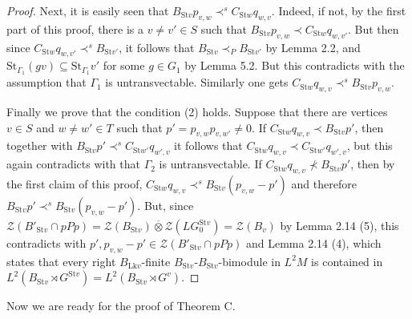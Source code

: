 \documentclass{amsart}
\theoremstyle{definition}
\renewcommand{\subset}{\subseteq}
\begin{document}
\begin{proof}
Next, it is easily seen that 
$B_{\mathrm{St}v}p_{v,w}\prec^s C_{\mathrm{St}w}q_{w,v}$. 
Indeed, if not, by the first part of this proof, there is a $v\neq v'\in S$ 
such that $B_{\mathrm{St}v}p_{v,w}\prec C_{\mathrm{St}w}q_{w,v'}$. 
But then since $C_{\mathrm{St}w}q_{w,v'} \prec^s B_{\mathrm{St}v'}$, 
it follows that $B_{\mathrm{St}v}\prec_P B_{\mathrm{St}v'}$ by Lemma 2.2, 
and $\mathrm{St}_{\Gamma_1}(gv) \subset \mathrm{St}_{\Gamma_1}v'$ for some $g\in G_1$ by Lemma 5.2. 
But this contradicts with the assumption that $\Gamma_1$ is untransvectable. 
Similarly one gets $C_{\mathrm{St}w}q_{w,v} \prec^s B_{\mathrm{St}v}p_{v,w}$. 

Finally we prove that the condition (2) holds. Suppose that there are vertices 
$v\in S$ and $w\neq w'\in T$ such that $p'=p_{v,w}p_{v,w'}\neq 0$.
If $C_{\mathrm{St}w}q_{w,v}\prec B_{\mathrm{St}v}p'$, 
then together with $B_{\mathrm{St}v}p'\prec^s C_{\mathrm{St}w'}q_{w',v}$
it follows that $C_{\mathrm{St}w}q_{w,v}\prec C_{\mathrm{St}w'}q_{w',v}$, 
but this again contradicts with that $\Gamma_2$ is untransvectable. 
If $C_{\mathrm{St}w}q_{w,v}\nprec B_{\mathrm{St}v}p'$, 
then by the first claim of this proof, 
$C_{\mathrm{St}w}q_{w,v}\prec^s B_{\mathrm{St}v}(p_{v,w}-p')$
and therefore $B_{\mathrm{St}v}p'\prec^s B_{\mathrm{St}v}(p_{v,w}-p')$. 
But,
since $\mathcal{Z}(B'_{\mathrm{St}v}\cap pPp)
=\mathcal{Z}(B_{\mathrm{St}v})\overline{\otimes}\mathcal{Z}(LG_0^{\mathrm{St}v})
=\mathcal{Z}(B_{v})$ 
by Lemma 2.14 (5), 
this contradicts with $p', p_{v,w}-p'\in \mathcal{Z}(B'_{\mathrm{St}v}\cap pPp)$
and Lemma 2.14 (4), which states that 
every right $B_{\mathrm{Lk}v}$-finite
$B_{\mathrm{St}v}$-$B_{\mathrm{St}v}$-bimodule in $L^2M$ 
is contained in $L^2(B_{\mathrm{St}v}\rtimes G^{\mathrm{St} v})=L^2(B_{\mathrm{St}v}\rtimes G^{v})$. 
\end{proof}








Now we are ready for the proof of Theorem C. 
\end{document}
